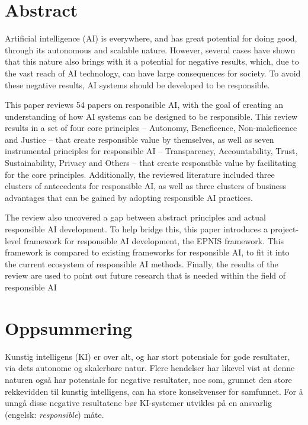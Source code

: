 \section*{Abstract}
Artificial intelligence (AI) is everywhere, and has great potential for doing good, through its autonomous and scalable nature. However, several cases have shown that this nature also brings with it a potential for negative results, which, due to the vast reach of AI technology, can have large consequences for society. To avoid these negative results, AI systems should be developed to be responsible.

This paper reviews 54 papers on responsible AI, with the goal of creating an understanding of how AI systems can be designed to be responsible. This review results in a set of four core principles -- Autonomy, Beneficence, Non-maleficence and Justice -- that create responsible value by themselves, as well as seven instrumental principles for responsible AI -- Transparency, Accountability, Trust, Sustainability, Privacy and Others -- that create responsible value by facilitating for the core principles. Additionally, the reviewed literature included three clusters of antecedents for responsible AI, as well as three clusters of business advantages that can be gained by adopting responsible AI practices.

The review also uncovered a gap between abstract principles and actual responsible AI development. To help bridge this, this paper introduces a project-level framework for responsible AI development, the EPNIS framework. This framework is compared to existing frameworks for responsible AI, to fit it into the current ecosystem of responsible AI methods. Finally, the results of the review are used to point out future research that is needed within the field of responsible AI

\newpage
\section*{Oppsummering}
Kunstig intelligens (KI) er over alt, og har stort potensiale for gode resultater, via dets autonome og skalerbare natur. Flere hendelser har likevel vist at denne naturen også har potensiale for negative resultater, noe som, grunnet den store rekkevidden til kunstig intelligens, can ha store konsekvenser for samfunnet. For å unngå disse negative resultatene bør KI-systemer utvikles på en ansvarlig (engelsk: \textit{responsible}) måte.

